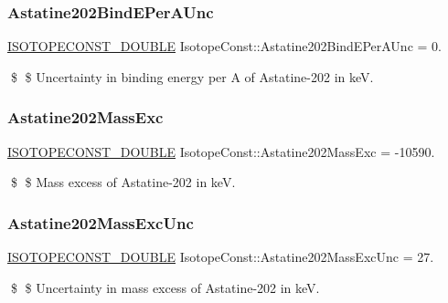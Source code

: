 \subsubsection{\texorpdfstring{Astatine202\+Bind\+E\+Per\+A\+Unc}{Astatine202BindEPerAUnc}}
{\footnotesize\ttfamily \mbox{\hyperlink{group___isotope_const-_macros_ga8f45a7272ce02c0b4c65c44636ed719a}{I\+S\+O\+T\+O\+P\+E\+C\+O\+N\+S\+T\+\_\+\+D\+O\+U\+B\+LE}} Isotope\+Const\+::\+Astatine202\+Bind\+E\+Per\+A\+Unc = 0.}

\$ \$ Uncertainty in binding energy per A of Astatine-\/202 in keV. \mbox{\label{group___isotope_const-_astatine-_at202_gade3b89fe9b7683c6f915d56ef60dbdc8}} 
\subsubsection{\texorpdfstring{Astatine202\+Mass\+Exc}{Astatine202MassExc}}
{\footnotesize\ttfamily \mbox{\hyperlink{group___isotope_const-_macros_ga8f45a7272ce02c0b4c65c44636ed719a}{I\+S\+O\+T\+O\+P\+E\+C\+O\+N\+S\+T\+\_\+\+D\+O\+U\+B\+LE}} Isotope\+Const\+::\+Astatine202\+Mass\+Exc = -\/10590.}

\$ \$ Mass excess of Astatine-\/202 in keV. \mbox{\label{group___isotope_const-_astatine-_at202_ga4d5c4e2a8bee496262d450a053f88035}} 
\subsubsection{\texorpdfstring{Astatine202\+Mass\+Exc\+Unc}{Astatine202MassExcUnc}}
{\footnotesize\ttfamily \mbox{\hyperlink{group___isotope_const-_macros_ga8f45a7272ce02c0b4c65c44636ed719a}{I\+S\+O\+T\+O\+P\+E\+C\+O\+N\+S\+T\+\_\+\+D\+O\+U\+B\+LE}} Isotope\+Const\+::\+Astatine202\+Mass\+Exc\+Unc = 27.}

\$ \$ Uncertainty in mass excess of Astatine-\/202 in keV. \mbox{\label{group___isotope_const-_astatine-_at202_gae79ff01d6f14889db10ff955bfaef671}} 
